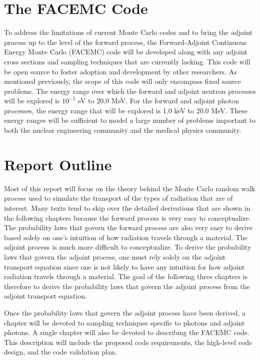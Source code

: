 \section{The FACEMC Code}
\label{sec:research_outline}
To address the limitations of current Monte Carlo codes and to bring the adjoint
process up to the level of the forward process, the Forward-Adjoint Continuous 
Energy Monte Carlo (FACEMC) code will be developed along with any adjoint
cross sections and sampling techniques that are currently lacking. This code 
will be open source to foster adoption and development by other researchers. As 
mentioned previously, the scope of this code will only encompass fixed source 
problems. The energy range over which the forward and adjoint neutron processes 
will be explored is $10^{-5}$ eV to 20.0 MeV. For the forward and adjoint photon
processes, the energy range that will be explored is 1.0 keV to 20.0 MeV. These 
energy ranges will be sufficient to model a large number of problems important 
to both the nuclear engineering community and the medical physics community. 

\section{Report Outline}
Most of this report will focus on the theory behind the Monte Carlo random 
walk process used to simulate the transport of the types of radiation 
that are of interest. Many texts tend to skip over the detailed derivations
that are shown in the following chapters because the forward process is very
easy to conceptualize. The probability laws that govern the forward process are
also very easy to derive based solely on one's intuition of how radiation
travels through a material. The adjoint process is much more difficult to
conceptualize. To derive the probability laws that govern the adjoint process,
one must rely solely on the adjoint transport equation since one is not likely
to have any intuition for how adjoint radiation travels through a material.
The goal of the following three chapters is therefore to derive the probability 
laws that govern the adjoint process from the adjoint transport equation. 

Once the probability laws that govern the adjoint process have been derived, a
chapter will be devoted to sampling techniques specific to photons and 
adjoint photons. A single chapter will also be devoted to describing the 
FACEMC code. This description will include the proposed code requirements, the 
high-level code design, and the code validation plan. 


